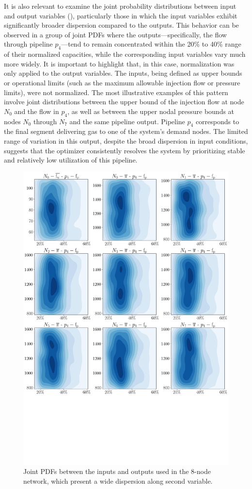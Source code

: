 It is also relevant to examine the joint probability distributions between input and output variables (), particularly those in which the input variables exhibit significantly broader dispersion compared to the outputs. This behavior can be observed in a group of joint PDFs where the outputs—specifically, the flow through pipeline $p_4$—tend to remain concentrated within the 20\% to 40\% range of their normalized capacities, while the corresponding input variables vary much more widely. It is important to highlight that, in this case, normalization was only applied to the output variables. The inputs, being defined as upper bounds or operational limits (such as the maximum allowable injection flow or pressure limits), were not normalized. The most illustrative examples of this pattern involve joint distributions between the upper bound of the injection flow at node $N_0$ and the flow in $p_4$, as well as between the upper nodal pressure bounds at nodes $N_0$ through $N_7$ and the same pipeline output. Pipeline $p_4$ corresponds to the final segment delivering gas to one of the system’s demand nodes. The limited range of variation in this output, despite the broad dispersion in input conditions, suggests that the optimizer consistently resolves the system by prioritizing stable and relatively low utilization of this pipeline. 


\begin{figure}[htbp]
    \begin{center}
        \includegraphics[width=.65\textwidth]{figures/Chapter_NonLinealCensnet/inputs_outputs_1.png}
    \end{center}
    \caption{Joint PDFs between the inputs and outputs used in the 8-node network, which present a wide dispersion along second variable. }
    \label{fig:joint_distributions_inputs_outputs_1}
\end{figure}



